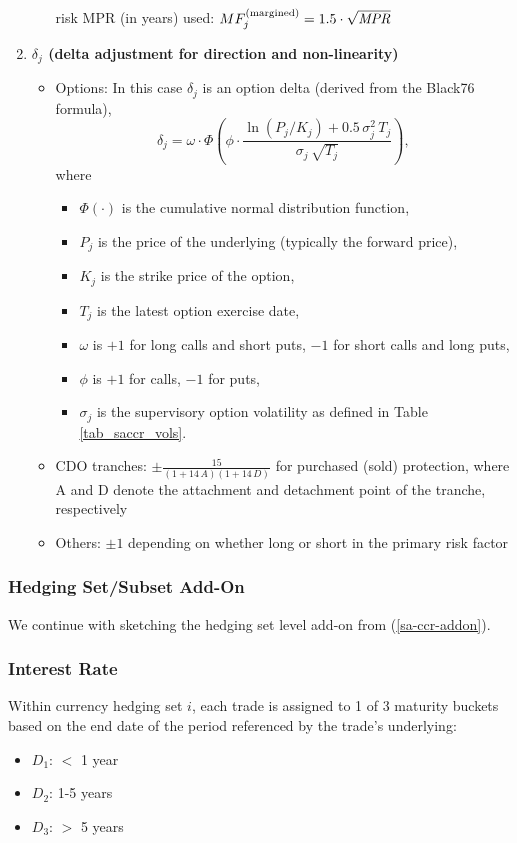 \begin{enumerate}
\begin{itemize}
  risk MPR (in years) used: $MF_j^{(\text{margined})} = 1.5\cdot\sqrt{\mathit{MPR}}$ 
\end{itemize}
\item {\bf $\delta_j$ (delta adjustment for direction and non-linearity)}
\begin{itemize}
\item Options: In this case $\delta_j$ is an option delta (derived from
  the Black76 formula),
$$\delta_j = \omega \cdot \Phi\!\left(\phi \cdot \frac{\ln(P_j/K_j) +
    0.5\,\sigma_j^2\,T_j}{\sigma_j\,\sqrt{T_j}} \right)\!,$$
where \begin{itemize}
    \item $\Phi(\cdot)$ is the cumulative normal distribution function,
    \item $P_j$ is the price of the underlying (typically the forward price),
    \item $K_j$ is the strike price of the option,
    \item $T_j$ is the latest option exercise date,
    \item $\omega$ is $+1$ for long calls and short puts, $-1$ for short calls and long puts,
    \item $\phi$ is $+1$ for calls, $-1$ for puts,
    \item $\sigma_j$ is the supervisory option volatility as defined in Table \ref{tab_saccr_vols}.
  \end{itemize}  
 \item CDO tranches: $\pm \frac{15}{(1+14\,A)(1+14\,D)}$ for purchased
  (sold) protection, where A and D denote the attachment and
  detachment point of the tranche, respectively
\item Others: $\pm 1$ depending on whether long or short in the primary risk factor
\end{itemize}
\end{enumerate}

\subsubsection{Hedging Set/Subset Add-On}

We continue with sketching the hedging set level add-on from (\ref{sa-ccr-addon}).

\subsubsection*{Interest Rate}

Within currency hedging set $i$, each trade is assigned to 1 of 3 maturity buckets based on the end date of the period referenced by the trade's underlying:
\begin{itemize}
\item $D_1$: $<$ 1 year
\item $D_2$: 1-5 years
\item $D_3$: $>$ 5 years
\end{itemize}

